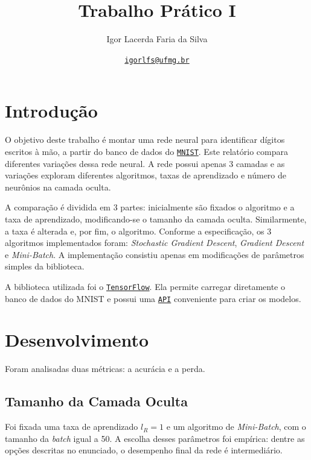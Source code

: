\documentclass[a4paper]{article}
\title{Trabalho Prático I}
\author{Igor Lacerda Faria da Silva}
\date{\href{mailto:igorlfs@ufmg.br}{\texttt{igorlfs@ufmg.br}} }
\begin{document}
\pagestyle{fancy}

\maketitle

\section{Introdução}
\label{sec:Introdução}

O objetivo deste trabalho é montar uma rede neural para identificar dígitos escritos à mão, a partir do banco de dados do \href{https://en.wikipedia.org/wiki/MNIST_database}{\texttt{MNIST}}. Este relatório compara diferentes variações dessa rede neural. A rede possui apenas 3 camadas e as variações exploram diferentes algoritmos, taxas de aprendizado e número de neurônios na camada oculta.

A comparação é dividida em 3 partes: inicialmente são fixados o algoritmo e a taxa de aprendizado, modificando-se o tamanho da camada oculta. Similarmente, a taxa é alterada e, por fim, o algoritmo. Conforme a especificação, os 3 algoritmos implementados foram: \textit{Stochastic Gradient Descent}, \textit{Gradient Descent} e \textit{Mini-Batch}. A implementação consistiu apenas em modificações de parâmetros simples da biblioteca.

A biblioteca utilizada foi o \href{https://www.tensorflow.org/}{\texttt{TensorFlow}}. Ela permite carregar diretamente o banco de dados do MNIST e possui uma \href{https://keras.io/api/}{\texttt{API}} conveniente para criar os modelos.

\section{Desenvolvimento}%
\label{sec:Desenvolvimento}

Foram analisadas duas métricas: a acurácia e a perda.

\subsection{Tamanho da Camada Oculta}%
\label{sub:Tamanho da Camada Oculta}

Foi fixada uma taxa de aprendizado $l_R = 1$ e um algoritmo de \textit{Mini-Batch}, com o tamanho da \textit{batch} igual a 50. A escolha desses parâmetros foi empírica: dentre as opções descritas no enunciado, o desempenho final da rede é intermediário.
\end{document}
